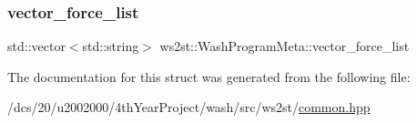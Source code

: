 \mbox{\label{structws2st_1_1WashProgramMeta_a4b2ccb325270ac70589972a556b704b5}} 
\subsubsection{\texorpdfstring{vector\+\_\+force\+\_\+list}{vector\_force\_list}}
{\footnotesize\ttfamily std\+::vector$<$std\+::string$>$ ws2st\+::\+Wash\+Program\+Meta\+::vector\+\_\+force\+\_\+list}



The documentation for this struct was generated from the following file\+:\begin{DoxyCompactItemize}
\item 
/dcs/20/u2002000/4th\+Year\+Project/wash/src/ws2st/\mbox{\hyperlink{common_8hpp}{common.\+hpp}}\end{DoxyCompactItemize}
